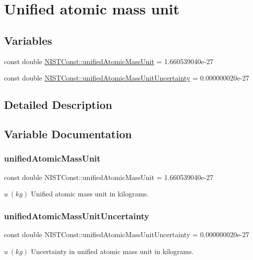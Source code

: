\hypertarget{group___unified_atomic_mass_unit}{}\section{Unified atomic mass unit}
\label{group___unified_atomic_mass_unit}
\subsection*{Variables}
\begin{DoxyCompactItemize}
\item 
const double \hyperlink{group___unified_atomic_mass_unit_ga5dbf5ee7e0ef084434d647e917855f39}{N\+I\+S\+T\+Const\+::unified\+Atomic\+Mass\+Unit} = 1.\+660539040e-\/27
\item 
const double \hyperlink{group___unified_atomic_mass_unit_ga28042f56f970858ec82e0279a88996f4}{N\+I\+S\+T\+Const\+::unified\+Atomic\+Mass\+Unit\+Uncertainty} = 0.\+000000020e-\/27
\end{DoxyCompactItemize}


\subsection{Detailed Description}


\subsection{Variable Documentation}
\mbox{\label{group___unified_atomic_mass_unit_ga5dbf5ee7e0ef084434d647e917855f39}} 
\subsubsection{\texorpdfstring{unified\+Atomic\+Mass\+Unit}{unifiedAtomicMassUnit}}
{\footnotesize\ttfamily const double N\+I\+S\+T\+Const\+::unified\+Atomic\+Mass\+Unit = 1.\+660539040e-\/27}

$u \ (kg)$ Unified atomic mass unit in kilograms. \mbox{\label{group___unified_atomic_mass_unit_ga28042f56f970858ec82e0279a88996f4}} 
\subsubsection{\texorpdfstring{unified\+Atomic\+Mass\+Unit\+Uncertainty}{unifiedAtomicMassUnitUncertainty}}
{\footnotesize\ttfamily const double N\+I\+S\+T\+Const\+::unified\+Atomic\+Mass\+Unit\+Uncertainty = 0.\+000000020e-\/27}

$u \ (kg)$ Uncertainty in unified atomic mass unit in kilograms. 